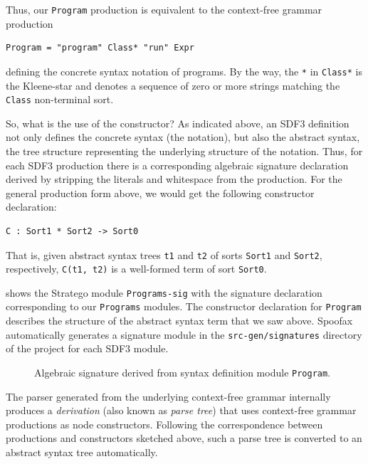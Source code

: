 Thus, our \texttt{Program} production is equivalent to the context-free grammar
production

\begin{lstlisting}[language=SDF]
  Program = "program" Class* "run" Expr
\end{lstlisting}

defining the concrete syntax notation of programs. By the way, the \texttt{*} in
\texttt{Class*} is the Kleene-star and denotes a sequence of zero or more
strings matching the \texttt{Class} non-terminal sort.

So, what is the use of the constructor? As indicated above, an SDF3 definition
not only defines the concrete syntax (the notation), but also the abstract
syntax, the tree structure representing the underlying structure of the
notation. Thus, for each SDF3 production there is a corresponding algebraic
signature declaration derived by stripping the literals and whitespace from the
production. For the general production form above, we would get the following
constructor declaration:

\begin{lstlisting}[language=Stratego]
  C : Sort1 * Sort2 -> Sort0
\end{lstlisting}

That is, given abstract syntax trees \texttt{t1} and \texttt{t2} of sorts
\texttt{Sort1} and \texttt{Sort2}, respectively, \texttt{C(t1, t2)} is a
well-formed term of sort \texttt{Sort0}.

 shows the Stratego module \texttt{Programs-sig}
with the signature declaration corresponding to our \texttt{Programs} modules.
The constructor declaration for \texttt{Program} describes the structure of the
abstract syntax term that we saw above. Spoofax automatically generates a
signature module in the \texttt{src-gen/signatures} directory of the project for
each SDF3 module.

\begin{figure}[t]

\caption{Algebraic signature derived from syntax definition module
\texttt{Program}.}
\end{figure}

The parser generated from the underlying context-free grammar internally
produces a \emph{derivation} (also known as \emph{parse tree}) that uses
context-free grammar productions as node constructors. Following the
correspondence between productions and constructors sketched above, such a parse
tree is converted to an abstract syntax tree automatically.

